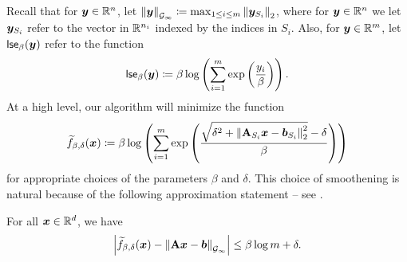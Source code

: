 Recall that for $\bm{y}\in\mathbb{R}^n$, let $\left\lVert \bm{y} \right\rVert_{\mathcal{G}_{\infty}} \coloneqq \max_{1 \le i \le m} \left\lVert \bm{y}_{S_i} \right\rVert_2$, where for $\bm{y}\in\mathbb{R}^n$ we let $\bm{y}_{S_i}$ refer to the vector in $\mathbb{R}^{n_i}$ indexed by the indices in $S_i$. Also, for $\bm{y}\in\mathbb{R}^m$, let $\mathsf{lse}_{\beta}(\bm{y})$ refer to the function
\begin{align*}
    \mathsf{lse}_{\beta}(\bm{y}) \coloneqq \beta\log\left(\sum_{i=1}^m \mathrm{exp}\left(\frac{y_i}{\beta}\right)\right).
\end{align*}
At a high level, our algorithm will minimize the function
\begin{align*}
    \widetilde{f}_{\beta,\delta}(\bm{x}) \coloneqq \beta\log\left(\sum_{i=1}^m \mathrm{exp}\left(\frac{\sqrt{\delta^2 + \left\lVert \mathbf{A}_{S_i}\bm{x}-\bm{b}_{S_i} \right\rVert_2^2}-\delta}{\beta}\right)\right)
\end{align*}
for appropriate choices of the parameters $\beta$ and $\delta$. This choice of smoothening is natural because of the following approximation statement -- see .
\begin{lemma}
\label{lemma:smooth_approx}
For all $\bm{x} \in\mathbb{R}^d$, we have
\begin{align*}
    \left\lvert \widetilde{f}_{\beta,\delta}(\bm{x})-\left\lVert \mathbf{A}\bm{x}-\bm{b} \right\rVert_{\mathcal{G}_{\infty}} \right\rvert \le \beta\log m + \delta.
\end{align*}
\end{lemma}
